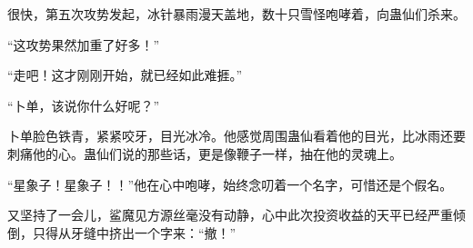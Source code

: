\begin{this_body}
很快，第五次攻势发起，冰针暴雨漫天盖地，数十只雪怪咆哮着，向蛊仙们杀来。

“这攻势果然加重了好多！”

“走吧！这才刚刚开始，就已经如此难捱。”

“卜单，该说你什么好呢？”

卜单脸色铁青，紧紧咬牙，目光冰冷。他感觉周围蛊仙看着他的目光，比冰雨还要刺痛他的心。蛊仙们说的那些话，更是像鞭子一样，抽在他的灵魂上。

“星象子！星象子！！”他在心中咆哮，始终念叨着一个名字，可惜还是个假名。

又坚持了一会儿，鲨魔见方源丝毫没有动静，心中此次投资收益的天平已经严重倾倒，只得从牙缝中挤出一个字来：“撤！”

\end{this_body}

